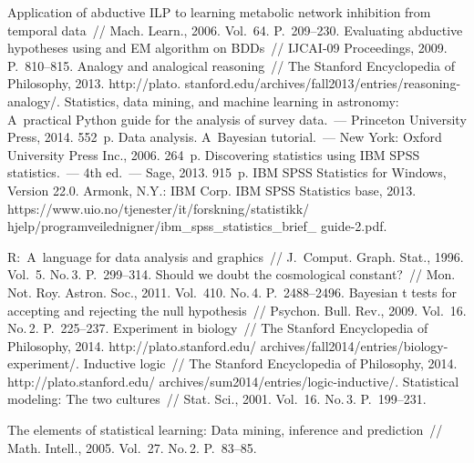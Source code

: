 \begin{multicols}{2}
{{\begin{thebibliography}{99}
 Application of
abductive ILP to learning metabolic network inhibition from temporal data~//
Mach. Learn., 2006. Vol.~64.  P.~209--230.
 Evaluating
abductive hypotheses using and EM algorithm on BDDs~// IJCAI-09 Proceedings,
2009. P.~810--815.
 Analogy and analogical reasoning~// The Stanford Encyclopedia of
Philosophy, 2013. {\sf
http://plato. stanford.edu/archives/fall2013/entries/reasoning-analogy/}.
 Statistics, data mining, and machine learning in astronomy: A~practical
Python guide for the analysis of survey data.~--- Princeton University Press, 2014.
552~p.
 Data analysis. A~Bayesian tutorial.~--- New
York: Oxford University Press Inc., 2006.  264~p.
 Discovering statistics using IBM SPSS statistics.~---
4th ed.~--- Sage, 2013.  915~p.
IBM SPSS Statistics for Windows, Version 22.0. Armonk, N.Y.: IBM Corp. IBM
SPSS Statistics base, 2013.
{\sf
https://www.uio.no/tjenester/it/forskning/statistikk/
hjelp/programveilednigner/ibm\_spss\_statistics\_brief\_ guide-2.pdf}.

 R:~A~language for data analysis and graphics~//
J.~Comput. Graph. Stat., 1996. Vol.~5. No.\,3. P.~299--314.
 Should we
doubt the cosmological constant?~// Mon. Not. Roy. Astron. Soc.,
2011. Vol.~410. No.\,4. P.~2488--2496.
 Bayesian t
tests for accepting and rejecting the null hypothesis~// Psychon. Bull.
Rev., 2009.  Vol.~16. No.\,2. P.~225--237.
 Experiment in biology~// The Stanford Encyclopedia of Philosophy,
2014. {\sf  http://plato.stanford.edu/ archives/fall2014/entries/biology-experiment/}.
 Inductive logic~// The Stanford Encyclopedia of Philosophy,
2014. {\sf http://plato.stanford.edu/ archives/sum2014/entries/logic-inductive/}.
 Statistical modeling: The two cultures~// Stat. Sci., 2001.
Vol.~16. No.\,3. P.~199--231.

 The elements of statistical
learning: Data mining, inference and prediction~// Math. Intell.,
2005. Vol.~27. No.\,2. P.~83--85.


\end{thebibliography}}}
\end{multicols}
